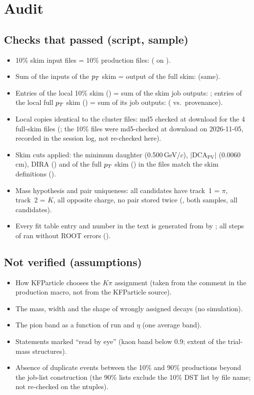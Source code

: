 \section{Audit}
\label{sec:audit}

\subsection*{Checks that passed (script, sample)}
\begin{itemize}
\item 10\% skim input files = 10\% production \Dzero{} files: \chkTenFiles{} ( on
  ).
\item Sum of the inputs of the $p_T$ skim = output of the full skim: \chkFullSum{} (same).
\item Entries of the local 10\% skim (\nTen) = sum of the skim job outputs: \chkTenEntries; entries of the local full
  $p_T$ skim (\nFull) = sum of its job outputs: \chkFullEntries{} ( vs.\ provenance).
\item Local copies identical to the cluster files: md5 checked at download for the 4 full-skim files
  (; the 10\% files were md5-checked at download on 2026-11-05, recorded in the session
  log, not re-checked here).
\item Skim cuts applied: the minimum daughter \pt{} (0.500\,GeV/$c$), $|\mathrm{DCA}_\mathrm{PV}|$ (0.0060\,cm), DIRA
  (\diraMinTen) and \Dzero{} \pt{} of the full $p_T$ skim (\ptMinFull) in the files match the skim definitions
  ().
\item Mass hypothesis and pair uniqueness: all candidates have track~1 = $\pi$, track~2 = $K$, all opposite charge, no
  pair stored twice (, both samples, all candidates).
\item Every fit table entry and number in the text is generated from  by ;
  all steps of  ran without ROOT errors ().
\end{itemize}

\subsection*{Not verified (assumptions)}
\begin{itemize}
\item How KFParticle chooses the $K\pi$ assignment (taken from the comment in the production macro, not from the
  KFParticle source).
\item The \Dzero{} mass, width and the shape of wrongly assigned \Dzero{} decays (no simulation).
\item The pion band as a function of run and $\eta$ (one average band).
\item Statements marked ``read by eye'' (kaon band below 0.9\gevc; extent of the trial-mass structures).
\item Absence of duplicate events between the 10\% and 90\% productions beyond the job-list construction (the 90\% lists
  exclude the 10\% DST list by file name; not re-checked on the ntuples).
\end{itemize}
